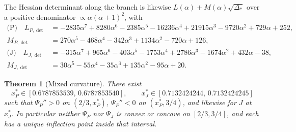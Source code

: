 \documentclass[11pt]{amsart}
\newtheorem{theorem}{Theorem}[section]
\theoremstyle{definition}
\newcommand{\1}{\mathbf 1}
\begin{document}
The Hessian determinant along the branch is likewise
$L(\alpha)+M(\alpha)\sqrt{\Delta_*}$ over a positive denominator
$\propto\alpha(\alpha+1)^2$, with
\begin{align*}
\text{(P)}\quad L_{P,\det} &= -2835\alpha^7+8280\alpha^6-2385\alpha^5-16236\alpha^4
+21915\alpha^3-9720\alpha^2+729\alpha+252,\\
            M_{P,\det} &= 270\alpha^5-468\alpha^4-342\alpha^3+1134\alpha^2-720\alpha+126,
\\
\text{(J)}\quad L_{J,\det} &= -315\alpha^7+965\alpha^6-403\alpha^5-1753\alpha^4
+2786\alpha^3-1674\alpha^2+432\alpha-38,\\
            M_{J,\det} &= 30\alpha^5-55\alpha^4-35\alpha^3+135\alpha^2-95\alpha+20.
\end{align*}

\begin{theorem}[Mixed curvature]
\label{thm:mixed-curvature}
There exist
\[
   x^*_P \in [0.6787853539,\,0.6787853540],
   \qquad
   x^*_J \in [0.7132424244,\,0.7132424245]
\]
such that $\Psi_P''>0$ on $(2/3,x^*_P)$, $\Psi_P''<0$ on $(x^*_P,3/4)$, and
likewise for $J$ at $x^*_J$.  In particular neither $\Psi_P$ nor $\Psi_J$ is
convex or concave on $[2/3,3/4]$, and each has a unique inflection point inside
that interval.
\end{theorem}
\end{document}
